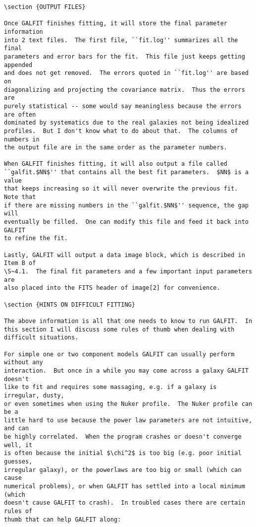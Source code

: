 \documentclass[preprint]{aastex}
\begin{document}
\begin {verbatim}
\section {OUTPUT FILES}

Once GALFIT finishes fitting, it will store the final parameter information
into 2 text files.  The first file, ``fit.log'' summarizes all the final
parameters and error bars for the fit.  This file just keeps getting appended
and does not get removed.  The errors quoted in ``fit.log'' are based on
diagonalizing and projecting the covariance matrix.  Thus the errors are
purely statistical -- some would say meaningless because the errors are often
dominated by systematics due to the real galaxies not being idealized
profiles.  But I don't know what to do about that.  The columns of numbers in
the output file are in the same order as the parameter numbers.

When GALFIT finishes fitting, it will also output a file called
``galfit.$NN$'' that contains all the best fit parameters.  $NN$ is a value
that keeps increasing so it will never overwrite the previous fit.  Note that
if there are missing numbers in the ``galfit.$NN$'' sequence, the gap will
eventually be filled.  One can modify this file and feed it back into GALFIT
to refine the fit.

Lastly, GALFIT will output a data image block, which is described in Item B of
\S~4.1.  The final fit parameters and a few important input parameters are
also placed into the FITS header of image[2] for convenience.

\section {HINTS ON DIFFICULT FITTING}

The above information is all that one needs to know to run GALFIT.  In
this section I will discuss some rules of thumb when dealing with
difficult situations.

For simple one or two component models GALFIT can usually perform without any
interaction.  But once in a while you may come across a galaxy GALFIT doesn't
like to fit and requires some massaging, e.g. if a galaxy is irregular, dusty,
or even sometimes when using the Nuker profile.  The Nuker profile can be a
little hard to use because the power law parameters are not intuitive, and can
be highly correlated.  When the program crashes or doesn't converge well, it
is often because the initial $\chi^2$ is too big (e.g. poor initial guesses,
irregular galaxy), or the powerlaws are too big or small (which can cause
numerical problems), or when GALFIT has settled into a local minimum (which
doesn't cause GALFIT to crash).  In troubled cases there are certain rules of
thumb that can help GALFIT along:


\end{verbatim}
\end{document}
